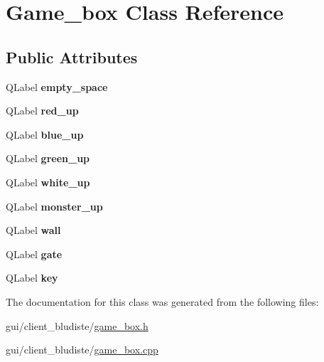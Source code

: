 \hypertarget{classGame__box}{\section{Game\-\_\-box Class Reference}
\label{classGame__box}
}
\subsection*{Public Attributes}
\begin{DoxyCompactItemize}
\item 
\hypertarget{classGame__box_a755e9a749701039da0230ffc4c9b613e}{Q\-Label {\bfseries empty\-\_\-space}}\label{classGame__box_a755e9a749701039da0230ffc4c9b613e}

\item 
\hypertarget{classGame__box_acd3c32c59c104251a1b2f058fdbb848c}{Q\-Label {\bfseries red\-\_\-up}}\label{classGame__box_acd3c32c59c104251a1b2f058fdbb848c}

\item 
\hypertarget{classGame__box_ae274ef1df1e06fb78f8219fbd2c003d2}{Q\-Label {\bfseries blue\-\_\-up}}\label{classGame__box_ae274ef1df1e06fb78f8219fbd2c003d2}

\item 
\hypertarget{classGame__box_a7fbfb76ed935e590087983fc79de458c}{Q\-Label {\bfseries green\-\_\-up}}\label{classGame__box_a7fbfb76ed935e590087983fc79de458c}

\item 
\hypertarget{classGame__box_aed641c26776ed262cd8ce48b850091a7}{Q\-Label {\bfseries white\-\_\-up}}\label{classGame__box_aed641c26776ed262cd8ce48b850091a7}

\item 
\hypertarget{classGame__box_a72dd43887a61d2bff2c4049d7dc102c8}{Q\-Label {\bfseries monster\-\_\-up}}\label{classGame__box_a72dd43887a61d2bff2c4049d7dc102c8}

\item 
\hypertarget{classGame__box_a3f05ae013e311e32f663f32fc7da3e7a}{Q\-Label {\bfseries wall}}\label{classGame__box_a3f05ae013e311e32f663f32fc7da3e7a}

\item 
\hypertarget{classGame__box_a02d120934f64ecb0b8b6f048e9b0cc48}{Q\-Label {\bfseries gate}}\label{classGame__box_a02d120934f64ecb0b8b6f048e9b0cc48}

\item 
\hypertarget{classGame__box_afaaa25ef1a491f4cd12759c62be5bbe1}{Q\-Label {\bfseries key}}\label{classGame__box_afaaa25ef1a491f4cd12759c62be5bbe1}

\end{DoxyCompactItemize}


The documentation for this class was generated from the following files\-:\begin{DoxyCompactItemize}
\item 
gui/client\-\_\-bludiste/\hyperlink{game__box_8h}{game\-\_\-box.\-h}\item 
gui/client\-\_\-bludiste/\hyperlink{game__box_8cpp}{game\-\_\-box.\-cpp}\end{DoxyCompactItemize}
